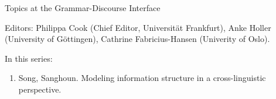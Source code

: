 {\large Topics at the Grammar-Discourse Interface}

\bigskip

Editors: Philippa Cook (Chief Editor, Universität Frankfurt),
    Anke Holler (University of Göttingen),
    Cathrine Fabricius-Hansen (Univerity of Oslo).


\bigskip

In this series:

\begin{enumerate}
\item Song, Sanghoun. Modeling information structure in a cross-linguistic perspective.
\end{enumerate}


\vfill


